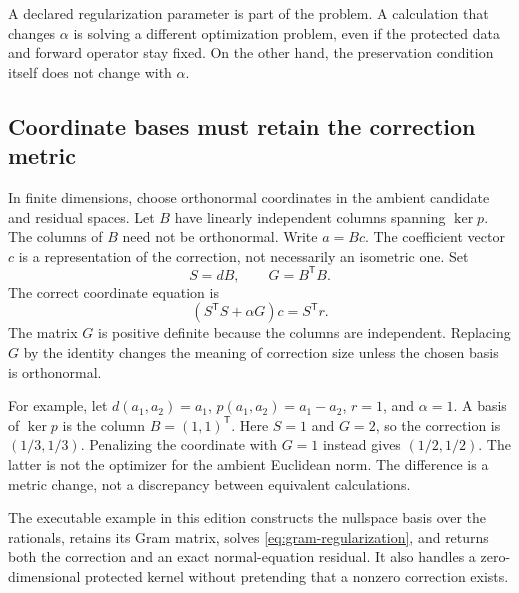 A declared regularization parameter is part of the problem. A calculation that changes $\alpha$ is solving a different optimization problem, even if the protected data and forward operator stay fixed. On the other hand, the preservation condition itself does not change with $\alpha$.

\subsection{Coordinate bases must retain the correction metric}
In finite dimensions, choose orthonormal coordinates in the ambient candidate and residual spaces. Let $B$ have linearly independent columns spanning $\ker p$. The columns of $B$ need not be orthonormal. Write $a=Bc$. The coefficient vector $c$ is a representation of the correction, not necessarily an isometric one. Set
\[
 S=dB,\qquad G=B^{\mathsf T}B.
\]
The correct coordinate equation is
\begin{equation}\label{eq:gram-regularization}
 (S^{\mathsf T}S+\alpha G)c=S^{\mathsf T}r.
\end{equation}
The matrix $G$ is positive definite because the columns are independent. Replacing $G$ by the identity changes the meaning of correction size unless the chosen basis is orthonormal.

For example, let $d(a_1,a_2)=a_1$, $p(a_1,a_2)=a_1-a_2$, $r=1$, and $\alpha=1$. A basis of $\ker p$ is the column $B=(1,1)^{\mathsf T}$. Here $S=1$ and $G=2$, so the correction is $(1/3,1/3)$. Penalizing the coordinate with $G=1$ instead gives $(1/2,1/2)$. The latter is not the optimizer for the ambient Euclidean norm. The difference is a metric change, not a discrepancy between equivalent calculations.

The executable example in this edition constructs the nullspace basis over the rationals, retains its Gram matrix, solves \eqref{eq:gram-regularization}, and returns both the correction and an exact normal-equation residual. It also handles a zero-dimensional protected kernel without pretending that a nonzero correction exists.

